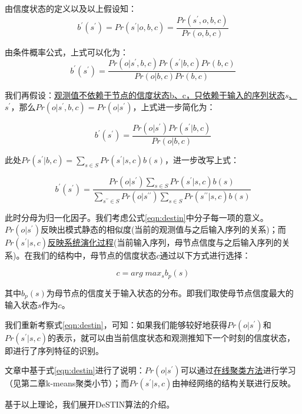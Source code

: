 由信度状态的定义以及以上假设知：
\begin{equation}
b^\prime(s^\prime) = Pr(s^\prime|o,b,c) = \dfrac{Pr(s^\prime, o, b, c)}{Pr(o, b, c)}
\end{equation}

由条件概率公式，上式可以化为：
\begin{equation}
b^\prime(s^\prime) = \dfrac{Pr(o|s^\prime,b,c)Pr(s^\prime|b,c)Pr(b,c)}{Pr(o|b,c)Pr(b,c)}
\end{equation}

我们再假设：\uline{观测值不依赖于节点的信度状态b、c，只依赖于输入的序列状态$s$、$s^\prime$}，那么$Pr(o|s^\prime,b,c) = Pr(o|s^\prime)$，上式进一步简化为：

\begin{equation}
b^\prime(s^\prime) = \dfrac{Pr(o|s^\prime)Pr(s^\prime|b,c)}{Pr(o|b,c)}
\end{equation}

此处$Pr(s^\prime|b,c) = \sum_{s\in S} Pr(s^\prime|s,c) b(s)$，进一步改写上式：

\begin{equation}
\label{eqn:destin}
b^\prime(s^\prime) = \dfrac{Pr(o|s^\prime)\sum_{s\in S} Pr(s^\prime|s,c) b(s)}{\sum_{s^{\prime\prime}\in S}Pr(o|s^{\prime\prime})\sum_{s\in S} Pr(s^{\prime\prime}|s,c) b(s)}
\end{equation}

此时分母为归一化因子。我们考虑公式\ref{eqn:destin}中分子每一项的意义。$Pr(o|s^\prime)$反映出模式静态的相似度(当前的观测值与之后输入序列的关系)；而$Pr(s^\prime|s,c)$\uline{反映系统演化过程}(当前输入序列，母节点信度与之后输入序列的关系)。在我们的结构中，母节点的信度状态$c$通过以下方式进行选择：

\begin{equation}
c = arg\;max_s b_p(s)
\end{equation}

其中$b_p(s)$为母节点的信度关于输入状态的分布。即我们取使母节点信度最大的输入状态$s$作为$c$。

我们重新考察式\ref{eqn:destin}，可知：如果我们能够较好地获得$Pr(o|s^\prime)$和$Pr(s^\prime|s,c)$的表示，就可以由当前信度状态和观测推知下一个时刻的信度状态，即进行了序列特征的识别。

文章\cite{Arel2009DeSTIN}中基于式\ref{eqn:destin}进行了说明：$Pr(o|s^\prime)$可以通过\uline{在线聚类方法}进行学习（见第二章k-means聚类小节）；而$Pr(s^\prime|s,c)$由神经网络的结构关联进行反映。

基于以上理论，我们展开DeSTIN算法的介绍。


